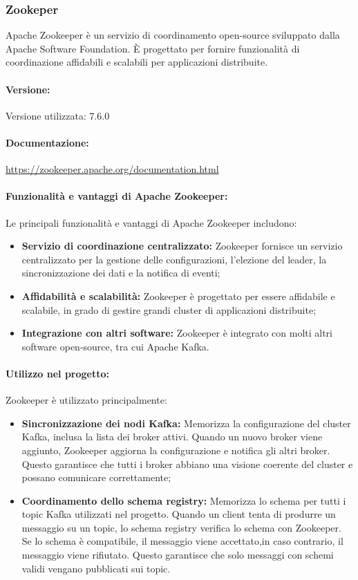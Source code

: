 \subsubsection{Zookeper}
Apache Zookeeper è un servizio di coordinamento open-source sviluppato dalla Apache Software Foundation. È progettato per fornire funzionalità di coordinazione affidabili e scalabili per applicazioni distribuite.

\paragraph{Versione:}
Versione utilizzata: 7.6.0

\paragraph{Documentazione:}
\url{https://zookeeper.apache.org/documentation.html}
\paragraph{Funzionalità e vantaggi di Apache Zookeeper:}
Le principali funzionalità e vantaggi di Apache Zookeeper includono:
\begin{itemize}
    \item \textbf{Servizio di coordinazione centralizzato:} Zookeeper fornisce un servizio centralizzato per la gestione delle configurazioni, l'elezione del leader, la sincronizzazione dei dati e la notifica di eventi;
    \item \textbf{Affidabilità e scalabilità:} Zookeeper è progettato per essere affidabile e scalabile, in grado di gestire grandi cluster di applicazioni distribuite;
    \item \textbf{Integrazione con altri software:} Zookeeper è integrato con molti altri software open-source, tra cui Apache Kafka.
\end{itemize}

\paragraph{Utilizzo nel progetto:}
Zookeeper è utilizzato principalmente:
\begin{itemize}
    \item \textbf{Sincronizzazione dei nodi Kafka:} Memorizza la configurazione del cluster Kafka, inclusa la lista dei broker attivi.
    Quando un nuovo broker viene aggiunto, Zookeeper aggiorna la configurazione e notifica gli altri broker.
    Questo garantisce che tutti i broker abbiano una visione coerente del cluster e possano comunicare correttamente;
    \item \textbf{Coordinamento dello schema registry:} Memorizza lo schema per tutti i topic Kafka utilizzati nel progetto.
    Quando un client tenta di produrre un messaggio su un topic, lo schema registry verifica lo schema con Zookeeper.
    Se lo schema è compatibile, il messaggio viene accettato,in caso contrario, il messaggio viene rifiutato.
    Questo garantisce che solo messaggi con schemi validi vengano pubblicati sui topic.
\end{itemize}
